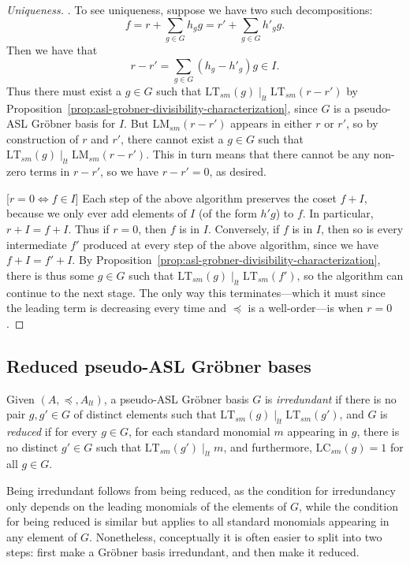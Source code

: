 \documentclass[11pt,reqno]{amsart}
\newcommand{\ltdivides}{\mid_{lt}}
\newcommand{\gb}{Gr\"{o}bner }
\newcommand{\lmsm}{\text{LM}_{sm}}
\newcommand{\lcsm}{\text{LC}_{sm}}
\newcommand{\ltsm}{\text{LT}_{sm}}
\theoremstyle{definition}
\numberwithin{equation}{section}
\begin{document}
\begin{proof}
[Uniqueness]. To see uniqueness, suppose we have two such decompositions: 
\[
f = r + \sum_{g \in G} h_g g = r' + \sum_{g \in G} h'_g g.
\] 
Then we have that 
\[
r-r' = \sum_{g \in G} (h_g - h'_g) g \in I.
\]
Thus there must exist a $g \in G$ such that $\ltsm(g) \ltdivides \ltsm(r-r')$ by Proposition~\ref{prop:asl-grobner-divisibility-characterization}, since $G$ is a pseudo-ASL \gb basis for $I$. But $\lmsm(r-r')$ appears in either $r$ or $r'$, so by construction of $r$ and $r'$, there cannot exist a $g \in G$ such that $\ltsm(g) \ltdivides \lmsm(r-r')$. This in turn means that there cannot be any non-zero terms in $r-r'$, so we have $r-r'=0$, as desired.

[$r=0 \Leftrightarrow f \in I$] Each step of the above algorithm preserves the coset $f + I$, because we only ever add elements of $I$ (of the form $h'g$) to $f$. In particular, $r + I = f+I$. Thus if $r=0$, then $f$ is in $I$. Conversely, if $f$ is in $I$, then so is every intermediate $f'$ produced at every step of the above algorithm, since we have $f + I = f' + I$. By Proposition~\ref{prop:asl-grobner-divisibility-characterization}, there is thus some $g \in G$ such that $\ltsm(g) \ltdivides \ltsm(f')$, so the algorithm can continue to the next stage. The only way this terminates---which it must since the leading term is decreasing every time and $\preceq$ is a well-order---is when $r=0$.
\end{proof}

\subsection{Reduced pseudo-ASL Gröbner bases}
\label{sec:reduced}

\begin{definition}[store=defnreducedgb, note=Irredundant/Reduced \gb Basis]
\label{defn:reduced-gb}
Given $(A, \preceq, A_{lt})$, a pseudo-ASL Gröbner basis $G$ is \emph{irredundant} if there is no pair $g,g' \in G$ of distinct elements such that $\ltsm(g) \ltdivides \ltsm(g')$, and $G$ is \emph{reduced} if for every $g \in G$, for each standard monomial $m$ appearing in $g$, there is no distinct $g' \in G$ such that $\ltsm(g') \ltdivides m$, and furthermore, $\lcsm(g) = 1$ for all $g \in G$. 
\end{definition}

Being irredundant follows from being reduced, as the condition for irredundancy only depends on the leading monomials of the elements of $G$, while the condition for being reduced is similar but applies to all standard monomials appearing in any element of $G$. Nonetheless, conceptually it is often easier to split into two steps: first make a Gröbner basis irredundant, and then make it reduced.
\end{document}
